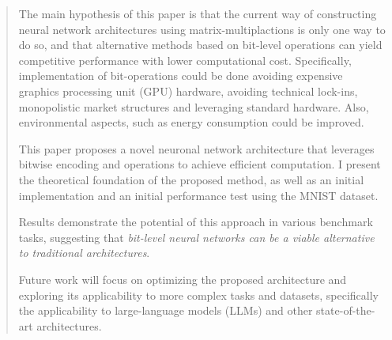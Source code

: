\begin{abstract}
The main hypothesis of this paper is that the current way of constructing neural network architectures using matrix-multiplactions is only one way to do so, and that alternative methods based on bit-level operations can yield competitive performance with lower computational cost. Specifically, implementation of bit-operations could be done avoiding expensive graphics processing unit (GPU) hardware, avoiding technical lock-ins, monopolistic market structures and leveraging standard hardware. Also, environmental aspects, such as energy consumption could be improved. 

This paper proposes a novel neuronal network architecture that leverages bitwise encoding and operations to achieve efficient computation. I present the theoretical foundation of the proposed method, as well as an initial implementation and an initial performance test using the MNIST dataset.

Results demonstrate the potential of this approach in various benchmark tasks, suggesting that \textit{bit-level neural networks can be a viable alternative to traditional architectures}.

Future work will focus on optimizing the proposed architecture and exploring its applicability to more complex tasks and datasets, specifically the applicability to large-language models (LLMs) and other state-of-the-art architectures.

\end{abstract}